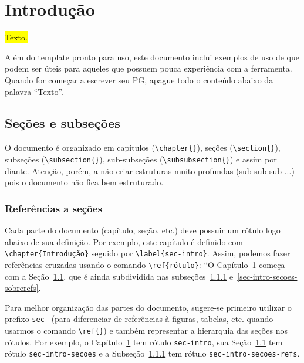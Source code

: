 \chapter{Introdução}
\label{sec-intro}

\hl{Texto.}

\hrulefill

Além do template pronto para uso, este documento inclui exemplos de uso de \latex que podem ser úteis para aqueles que possuem pouca experiência com a ferramenta. Quando for começar a escrever seu PG, apague todo o conteúdo abaixo da palavra ``Texto''.



\section{Seções e subseções}
\label{sec-intro-secoes}

O documento é organizado em capítulos (\texttt{\textbackslash chapter\{\}}), seções (\texttt{\textbackslash section\{\}}), subseções (\texttt{\textbackslash subsection\{\}}), sub-subseções (\texttt{\textbackslash subsubsection\{\}}) e assim por diante. Atenção, porém, a não criar estruturas muito profundas (sub-sub-sub-...) pois o documento não fica bem estruturado.


\subsection{Referências a seções}
\label{sec-intro-secoes-refs}

Cada parte do documento (capítulo, seção, etc.) deve possuir um rótulo logo abaixo de sua definição. Por exemplo, este capítulo é definido com \texttt{\textbackslash chapter\{Introdução\}} seguido por \texttt{\textbackslash label\{sec-intro\}}. Assim, podemos fazer referências cruzadas usando o comando \texttt{\textbackslash ref\{rótulo\}}: ``O Capítulo~\ref{sec-intro} começa com a Seção~\ref{sec-intro-secoes}, que é ainda subdividida nas subseções~\ref{sec-intro-secoes-refs} e~\ref{sec-intro-secoes-sobrerefs}.

Para melhor organização das partes do documento, sugere-se primeiro utilizar o prefixo \texttt{sec-} (para diferenciar de referências à figuras, tabelas, etc. quando usarmos o comando \texttt{\textbackslash ref\{\}}) e também representar a hierarquia das seções nos rótulos. Por exemplo, o Capítulo~\ref{sec-intro} tem rótulo \texttt{sec-intro}, sua Seção~\ref{sec-intro-secoes} tem rótulo \texttt{sec-intro-secoes} e a Subseção~\ref{sec-intro-secoes-refs} tem rótulo \texttt{sec-intro-secoes-refs}.



